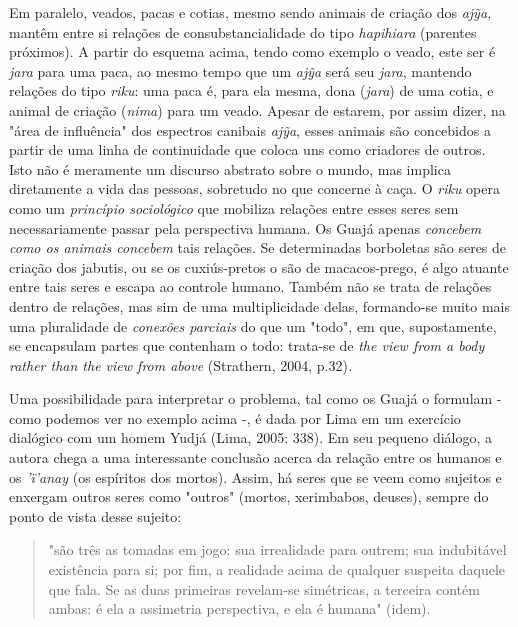 Em paralelo, veados, pacas e cotias, mesmo sendo animais de criação dos
\emph{ajỹa,} mantêm entre si relações de consubstancialidade do tipo
\emph{hapihiara} (parentes próximos). A partir do esquema acima, tendo
como exemplo o veado, este ser é \emph{jara} para uma paca, ao mesmo
tempo que um \emph{ajỹa} será seu \emph{jara}, mantendo relações do tipo
\emph{riku}: uma paca é, para ela mesma, dona (\emph{jara}) de uma
cotia, e animal de criação (\emph{nima}) para um veado. Apesar de
estarem, por assim dizer, na "área de influência" dos espectros canibais
\emph{ajỹa}, esses animais são concebidos a partir de uma linha de
continuidade que coloca uns como criadores de outros. Isto não é
meramente um discurso abstrato sobre o mundo, mas implica diretamente a
vida das pessoas, sobretudo no que concerne à caça. O \emph{riku} opera
como um \emph{princípio sociológico} que mobiliza relações entre esses
seres sem necessariamente passar pela perspectiva humana. Os Guajá
apenas \emph{concebem} \emph{como os animais concebem} tais relações. Se
determinadas borboletas são seres de criação dos jabutis, ou se os
cuxiús-pretos o são de macacos-prego, é algo atuante entre tais seres e
escapa ao controle humano. Também não se trata de relações dentro de
relações, mas sim de uma multiplicidade delas, formando-se muito mais
uma pluralidade de \emph{conexões parciais} do que um "todo", em que,
supostamente, se encapsulam partes que contenham o todo: trata-se de
\emph{the view from a body rather than the view from above} (Strathern,
2004, p.32)\emph{.}

Uma possibilidade para interpretar o problema, tal como os Guajá o
formulam - como podemos ver no exemplo acima -, é dada por Lima em um
exercício dialógico com um homem Yudjá (Lima, 2005: 338). Em seu pequeno
diálogo, a autora chega a uma interessante conclusão acerca da relação
entre os humanos e os \emph{'ï'anay} (os espíritos dos mortos). Assim,
há seres que se veem como sujeitos e enxergam outros seres como "outros"
(mortos, xerimbabos, deuses), sempre do ponto de vista desse sujeito:

\begin{quote}
"são três as tomadas em jogo: sua irrealidade para outrem; sua
indubitável existência para si; por fim, a realidade acima de qualquer
suspeita daquele que fala. Se as duas primeiras revelam-se simétricas, a
terceira contém ambas: é ela a assimetria perspectiva, e ela é humana"
(idem).
\end{quote}

